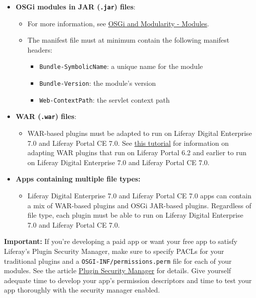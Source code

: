\begin{itemize}
\tightlist
\item
  \textbf{OSGi modules in JAR (\texttt{.jar}) files}:

  \begin{itemize}
  \tightlist
  \item
    For more information, see
    \href{/docs/7-0/tutorials/-/knowledge_base/t/osgi-and-modularity\#modules}{OSGi
    and Modularity - Modules}.
  \item
    The manifest file must at minimum contain the following manifest
    headers:

    \begin{itemize}
    \tightlist
    \item
      \texttt{Bundle-SymbolicName}: a unique name for the module
    \item
      \texttt{Bundle-Version}: the module's version
    \item
      \texttt{Web-ContextPath}: the servlet context path
    \end{itemize}
  \end{itemize}
\item
  \textbf{WAR (\texttt{.war}) files}:

  \begin{itemize}
  \tightlist
  \item
    WAR-based plugins must be adapted to run on Liferay Digital
    Enterprise 7.0 and Liferay Portal CE 7.0. See
    \href{/docs/7-0/tutorials/-/knowledge_base/t/liferay-upgrade-planner}{this
    tutorial} for information on adapting WAR plugins that run on
    Liferay Portal 6.2 and earlier to run on Liferay Digital Enterprise
    7.0 and Liferay Portal CE 7.0.
  \end{itemize}
\item
  \textbf{Apps containing multiple file types:}

  \begin{itemize}
  \tightlist
  \item
    Liferay Digital Enterprise 7.0 and Liferay Portal CE 7.0 apps can
    contain a mix of WAR-based plugins and OSGi JAR-based plugins.
    Regardless of file type, each plugin must be able to run on Liferay
    Digital Enterprise 7.0 and Liferay Portal CE 7.0.
  \end{itemize}
\end{itemize}

\noindent\hrulefill 

\textbf{Important:} If you're developing a paid app or want
your free app to satisfy Liferay's Plugin Security Manager, make sure to
specify PACLs for your traditional plugins and a
\texttt{OSGI-INF/permissions.perm} file for each of your modules. See
the article
\href{https://dev.liferay.com/participate/liferaypedia/-/wiki/Main/Portal+Security+Manager}{Plugin
Security Manager} for details. Give yourself adequate time to develop
your app's permission descriptors and time to test your app thoroughly
with the security manager enabled. 

